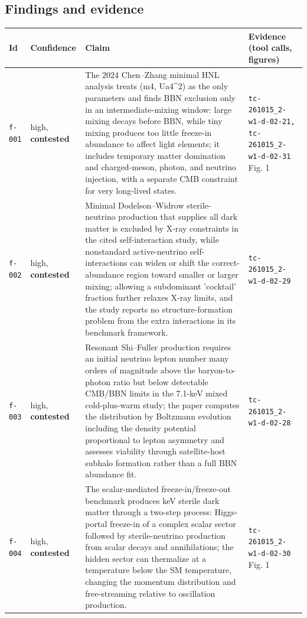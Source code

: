 \documentclass[11pt,a4paper]{article}
\begin{document}
\subsection{Findings and evidence}
\begin{longtable}{@{}p{}p{}p{}p{}@{}}
\toprule Id & Confidence & Claim & Evidence (tool calls, figures) \\ \midrule \endhead
\texttt{f-001} & high, \textbf{contested} & The 2024 Chen--Zhang minimal HNL analysis treats (m4, \textbar{}Ua4\textbar{}\textasciicircum{}2) as the only parameters and finds BBN exclusion only in an intermediate-mixing window: large mixing decays before BBN, while tiny mixing produces too little freeze-in abundance to affect light elements; it includes temporary matter domination and charged-meson, photon, and neutrino injection, with a separate CMB constraint for very long-lived states. & \texttt{tc-261015\_\allowbreak{}2-w1-d-02-21,\allowbreak{} tc-261015\_\allowbreak{}2-w1-d-02-31} Fig. 1 \\
\texttt{f-002} & high, \textbf{contested} & Minimal Dodelson--Widrow sterile-neutrino production that supplies all dark matter is excluded by X-ray constraints in the cited self-interaction study, while nonstandard active-neutrino self-interactions can widen or shift the correct-abundance region toward smaller or larger mixing; allowing a subdominant 'cocktail' fraction further relaxes X-ray limits, and the study reports no structure-formation problem from the extra interactions in its benchmark framework. & \texttt{tc-261015\_\allowbreak{}2-w1-d-02-29} \\
\texttt{f-003} & high, \textbf{contested} & Resonant Shi--Fuller production requires an initial neutrino lepton number many orders of magnitude above the baryon-to-photon ratio but below detectable CMB/BBN limits in the 7.1-keV mixed cold-plus-warm study; the paper computes the distribution by Boltzmann evolution including the density potential proportional to lepton asymmetry and assesses viability through satellite-host subhalo formation rather than a full BBN abundance fit. & \texttt{tc-261015\_\allowbreak{}2-w1-d-02-28} \\
\texttt{f-004} & high, \textbf{contested} & The scalar-mediated freeze-in/freeze-out benchmark produces keV sterile dark matter through a two-step process: Higgs-portal freeze-in of a complex scalar sector followed by sterile-neutrino production from scalar decays and annihilations; the hidden sector can thermalize at a temperature below the SM temperature, changing the momentum distribution and free-streaming relative to oscillation production. & \texttt{tc-261015\_\allowbreak{}2-w1-d-02-30} Fig. 1 \\

\end{longtable}
\end{document}
